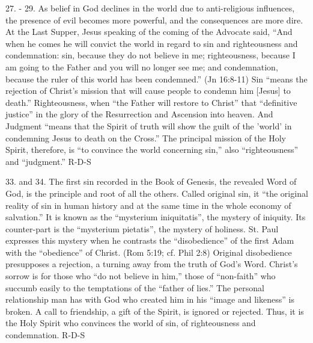 \documentclass[oneside]{book}
\begin{document}
27. - 29. As belief in God declines in the world due to anti-religious
influences, the presence of evil becomes more powerful, and the consequences are
more dire. At the Last Supper, Jesus speaking of the coming of the Advocate
said, ``And when he comes he will convict the world in regard to sin and
righteousness and condemnation: sin, because they do not believe in me;
righteousness, because I am going to the Father and you will no longer see me;
and condemnation, because the ruler of this world has been condemned.'' (Jn
16:8-11) Sin ``means the rejection of Christ's mission that will cause people to
condemn him [Jesus] to death.'' Righteousness, when ``the Father will restore to
Christ'' that ``definitive justice'' in the glory of the Resurrection and
Ascension into heaven. And Judgment ``means that the Spirit of truth will show
the guilt of the 'world' in condemning Jesus to death on the Cross.'' The
principal mission of the Holy Spirit, therefore, is ``to convince the world
concerning sin,'' also ``righteousness'' and ``judgment.''
R-D-S

33. and 34. The first sin recorded in the Book of Genesis, the revealed Word of
God, is the principle and root of all the others. Called original sin, it ``the
original reality of sin in human history and at the same time in the whole
economy of salvation.'' It is known as the ``mysterium iniquitatis'', the
mystery of iniquity. Its counter-part is the ``mysterium pietatis'', the mystery
of holiness. St. Paul expresses this mystery when he contrasts the
``disobedience'' of the first Adam with the ``obedience'' of Christ. (Rom 5:19;
cf. Phil 2:8) Original disobedience presupposes a rejection, a turning away from
the truth of God's Word. Christ's sorrow is for those who ``do not believe in
him,'' those of ``non-faith'' who succumb easily to the temptations of the
``father of lies.'' The personal relationship man has with God who created him
in his ``image and likeness'' is broken. A call to friendship, a gift of the
Spirit, is ignored or rejected. Thus, it is the Holy Spirit who convinces the
world of sin, of righteousness and condemnation.
R-D-S
\end{document}
